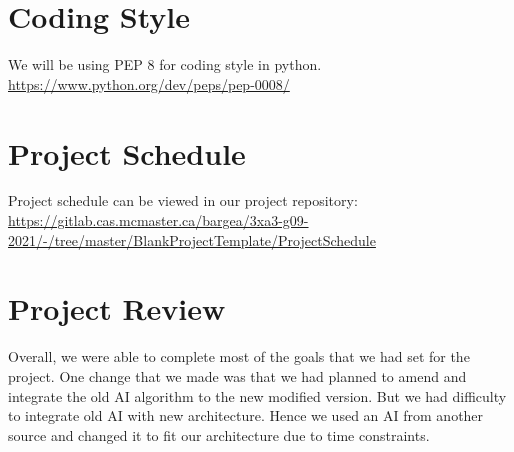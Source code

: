 \documentclass{article}
\begin{document}
\section{Coding Style}
We will be using PEP 8 for coding style in python. \\ \url{https://www.python.org/dev/peps/pep-0008/}

\section{Project Schedule}

Project schedule can be viewed in our project repository:\\
\url{https://gitlab.cas.mcmaster.ca/bargea/3xa3-g09-2021/-/tree/master/BlankProjectTemplate/ProjectSchedule}

\section{Project Review}
Overall, we were able to complete most of the goals that we had set for the project. One change that we made was that we had planned to amend and integrate the old AI algorithm to the new modified version. But we had difficulty to integrate old AI with new architecture. Hence we used an AI from another source and changed it to fit our architecture due to time constraints.
\end{document}
